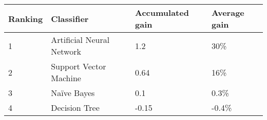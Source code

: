 \begin{tabular}{|l|l|l|l|}
\hline
Ranking  & Classifier                & Accumulated gain  & Average gain\\
\hline
1        & Artificial Neural Network & 1.2  & 30\%        \\
2        & Support Vector Machine    & 0.64  & 16\%       \\
3        & Naïve Bayes               & 0.1   & 0.3\%         \\
4        & Decision Tree             & -0.15  & -0.4\%         \\




\hline
\end{tabular}
